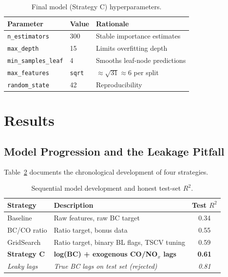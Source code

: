 \documentclass[11pt, a4paper]{article}
\begin{document}
\begin{table}[H]
\centering
\caption{Final model (Strategy C) hyperparameters.}
\label{tab:params}
\vspace{2pt}
\small
\begin{tabular}{lll}
\toprule
\textbf{Parameter}          & \textbf{Value}        & \textbf{Rationale}                         \\
\midrule
\texttt{n\_estimators}      & 300                   & Stable importance estimates                \\
\texttt{max\_depth}         & 15                    & Limits overfitting depth                   \\
\texttt{min\_samples\_leaf} & 4                     & Smooths leaf-node predictions              \\
\texttt{max\_features}      & \texttt{sqrt}         & $\approx\!\sqrt{31}\approx 6$ per split    \\
\texttt{random\_state}      & 42                    & Reproducibility                            \\
\bottomrule
\end{tabular}
\end{table}

\section{Results}

\subsection{Model Progression and the Leakage Pitfall}

Table~\ref{tab:models} documents the chronological development of four strategies.

\begin{table}[H]
\centering
\caption{Sequential model development and honest test-set $R^2$.}
\label{tab:models}
\vspace{2pt}
\small
\begin{tabular}{llc}
\toprule
\textbf{Strategy}         & \textbf{Description}                                  & \textbf{Test $R^2$} \\
\midrule
Baseline                  & Raw features, raw BC target                           & 0.34 \\
BC/CO ratio               & Ratio target, bonus data                              & 0.55 \\
GridSearch                & Ratio target, binary BL flags, TSCV tuning            & 0.59 \\
\textbf{Strategy C}       & \textbf{log(BC) + exogenous CO/NO$_x$ lags}           & \textbf{0.61} \\
\textit{Leaky lags}       & \textit{True BC lags on test set (rejected)}          & \textit{0.81} \\
\bottomrule
\end{tabular}
\end{table}
\end{document}
